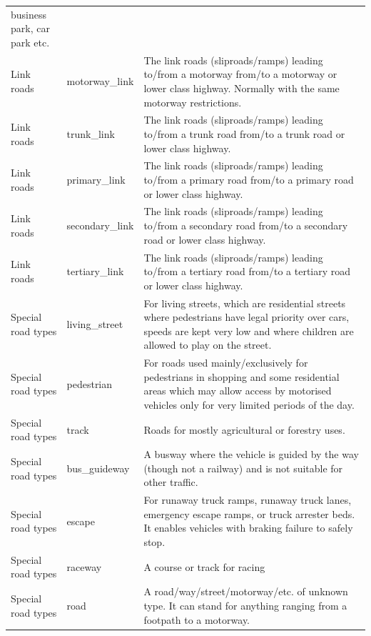 \documentclass[abstract=on,10pt,a4paper,bibliography=totocnumbered]{scrartcl}
\begin{document}
\begin{table}[h]
\begin{center}
{\begin{tabular}{llp{13cm}}
          business park, car park etc. \\
      \rowcolor[gray]{0.80}
      Link roads &
        motorway\_link &
          The link roads (sliproads/ramps) leading to/from a motorway from/to
          a motorway or lower class highway. Normally with the same motorway
          restrictions. \\
      \rowcolor[gray]{0.80}
      Link roads &
        trunk\_link &
          The link roads (sliproads/ramps) leading to/from a trunk road
          from/to a trunk road or lower class highway. \\
      \rowcolor[gray]{0.80}
      Link roads &
        primary\_link &
          The link roads (sliproads/ramps) leading to/from a primary road
          from/to a primary road or lower class highway. \\
      \rowcolor[gray]{0.80}
      Link roads &
        secondary\_link &
          The link roads (sliproads/ramps) leading to/from a secondary road
          from/to a secondary road or lower class highway. \\
      Link roads &
        tertiary\_link &
          The link roads (sliproads/ramps) leading to/from a tertiary road
          from/to a tertiary road or lower class highway. \\
      Special road types &
        living\_street &
          For living streets, which are residential streets where pedestrians
          have legal priority over cars, speeds are kept very low and where
          children are allowed to play on the street. \\
      Special road types &
        pedestrian &
          For roads used mainly/exclusively for pedestrians in shopping and
          some residential areas which may allow access by motorised vehicles
          only for very limited periods of the day. \\
      Special road types &
        track &
          Roads for mostly agricultural or forestry uses. \\
      Special road types &
        bus\_guideway &
          A busway where the vehicle is guided by the way (though not a railway)
          and is not suitable for other traffic. \\
      Special road types &
        escape &
          For runaway truck ramps, runaway truck lanes, emergency escape
          ramps, or truck arrester beds. It enables vehicles with braking
          failure to safely stop. \\
      Special road types &
        raceway &
          A course or track for racing \\
      Special road types &
        road &
          A road/way/street/motorway/etc. of unknown type. It can stand for
          anything ranging from a footpath to a motorway. \\
      \bottomrule
      \end{tabular}
    }
  \end{center}
\end{table}
\end{document}
